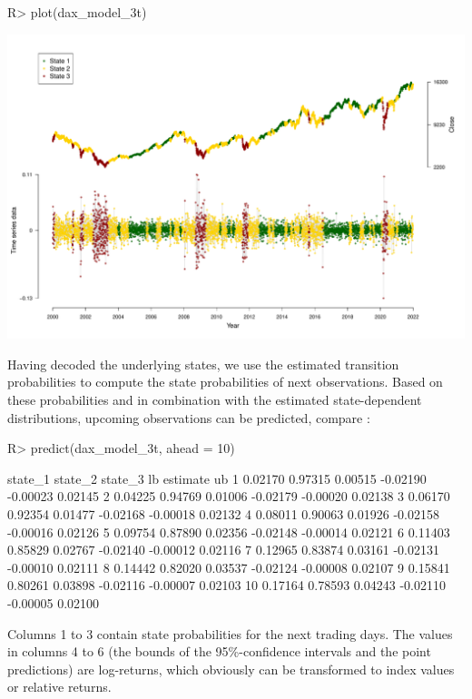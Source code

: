 \documentclass[article]{jss}
\begin{document}
%
\begin{Schunk}
\begin{Sinput}
R> plot(dax_model_3t)
\end{Sinput}
\end{Schunk}
\includegraphics{fhmm_oelschlaeger_adam_michels-dax-dec-ts}
%

Having decoded the underlying states, we use the estimated transition probabilities to compute the state probabilities of next observations. Based on these probabilities and in combination with the estimated state-dependent distributions, upcoming observations can be predicted, compare \cite{zuc16}:

%
\begin{Schunk}
\begin{Sinput}
R> predict(dax_model_3t, ahead = 10)
\end{Sinput}
\begin{Soutput}
   state_1 state_2 state_3       lb estimate      ub
1  0.02170 0.97315 0.00515 -0.02190 -0.00023 0.02145
2  0.04225 0.94769 0.01006 -0.02179 -0.00020 0.02138
3  0.06170 0.92354 0.01477 -0.02168 -0.00018 0.02132
4  0.08011 0.90063 0.01926 -0.02158 -0.00016 0.02126
5  0.09754 0.87890 0.02356 -0.02148 -0.00014 0.02121
6  0.11403 0.85829 0.02767 -0.02140 -0.00012 0.02116
7  0.12965 0.83874 0.03161 -0.02131 -0.00010 0.02111
8  0.14442 0.82020 0.03537 -0.02124 -0.00008 0.02107
9  0.15841 0.80261 0.03898 -0.02116 -0.00007 0.02103
10 0.17164 0.78593 0.04243 -0.02110 -0.00005 0.02100
\end{Soutput}
\end{Schunk}
%

Columns 1 to 3 contain state probabilities for the next  trading days. The values in columns 4 to 6 (the bounds of the 95\%-confidence intervals and the point predictions) are log-returns, which obviously can be transformed to index values or relative returns.
\end{document}
